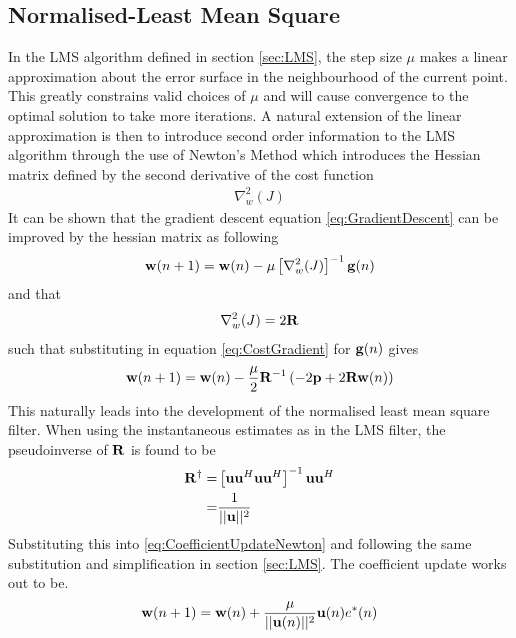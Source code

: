 \subsection{Normalised-Least Mean Square}
\label{sec:NLMS}
In the LMS algorithm defined in section \ref{sec:LMS}, %
the step size $\mu$ makes a linear approximation %
about the error surface in the neighbourhood of the %
current point. This greatly constrains valid choices %
of $\mu$ and will cause convergence to the %
optimal solution to take more iterations. %
A natural extension of the linear approximation is %
then to introduce second order information to the LMS %
algorithm through the use of Newton's Method which %
introduces the Hessian matrix defined by the second %
derivative of the cost function
\begin{align}
	\nabla_{w}^{2}(J)
\end{align}
It can be shown \cite{Hay02,Sayed03} that the %
gradient descent equation \ref{eq:GradientDescent} %
can be improved by the hessian matrix as following
\begin{align}
	\bold{w}(n+1) = \bold{w}(n) - \mu\left[\nabla_{w}^{2}(J)\right]^{-1}\bold{g}(n)
\end{align}
and that
\begin{align}
	\nabla_{w}^{2}(J) = 2\bold{R}
\end{align}
such that substituting in equation \ref{eq:CostGradient} for $\bold{g}(n)$ gives
\begin{align}
	\bold{w}(n+1) = \bold{w}(n) - \frac{\mu}{2}\bold{R}^{-1}\left(
	-2\bold{p} + 2\bold{R}\bold{w}(n)\right)
	\label{eq:CoefficientUpdateNewton}
\end{align}
This naturally leads into the development of the normalised %
least mean square filter. When using the instantaneous estimates %
as in the LMS filter, the pseudoinverse of $\bold{R}$ is found to be
\begin{align}
	\bold{R}^{\dagger} =& \left[\bold{u}\bold{u}^{H}
	\bold{u}\bold{u}^{H}\right]^{-1}\bold{u}\bold{u}^{H}\\
	=& \frac{1}{\lvert\lvert\bold{u}\rvert\rvert^{2}}
\end{align}
Substituting this into \ref{eq:CoefficientUpdateNewton} and %
following %
the same substitution and simplification in section \ref{sec:LMS}. %
The coefficient update works out to be.
\begin{align}
	\bold{w}(n+1) = \bold{w}(n) + \frac{\mu}{\lvert\lvert\bold{u}(n)\rvert
	\rvert^{2}}\bold{u}(n)e^{*}(n)
	\label{eq:NLMS}
\end{align}
